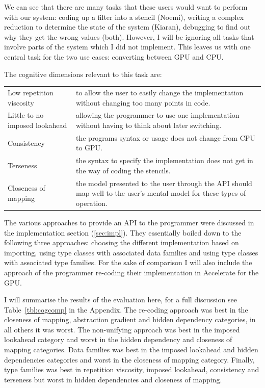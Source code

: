 \documentclass[12pt,a4paper,oneside]{scrbook}
\begin{document}
We can see that there are many tasks that these users would want to
perform with our system: coding up a filter into a stencil (Noemi),
writing a complex reduction to determine the state of the system
(Kiaran), debugging to find out why they get the wrong values (both).
However, I will be ignoring all tasks that involve parts of the system
which I did not implement. This leaves us with one central task for the
two use cases: converting between GPU and CPU.

The cognitive dimensions relevant to this task are:

\begin{tabular}{p{} p{}}
  Low repetition viscosity & to allow the user to easily change the
  implementation without changing too many points in code.
  \\
  Little to no imposed lookahead & allowing the programmer to use one
  implementation without having to think about later switching.
  \\
  Consistency & the programs syntax or usage does not change from CPU to
  GPU.
  \\
  Terseness & the syntax to specify the implementation does not get in the
  way of coding the stencils.
  \\
  Closeness of mapping & the model presented to the user through the API should
  map well to the user's mental model for these types of
  operation.
  \\
\end{tabular}

The various approaches to provide an API to the programmer were discussed in the
implementation section (\ref{sec:impl}). They essentially boiled down to the
following three approaches: choosing the different implementation based on
importing, using type classes with associated data families and using type
classes with associated type families. For the sake of comparison I will also
include the approach of the programmer re-coding their implementation in
Accelerate for the GPU.

I will summarise the results of the evaluation here, for a full discussion see
Table~\ref{tbl:cogcomp} in the Appendix. The re-coding approach was best in the
closeness of mapping, abstraction gradient and hidden dependency categories, in
all others it was worst. The non-unifying approach was best in the imposed
lookahead category and worst in the hidden dependency and closeness of mapping
categories. Data families was best in the imposed lookahead and hidden
dependencies categories and worst in the closeness of mapping category. Finally,
type families was best in repetition viscosity, imposed lookahead, consistency
and terseness but worst in hidden dependencies and closeness of mapping.
\end{document}
